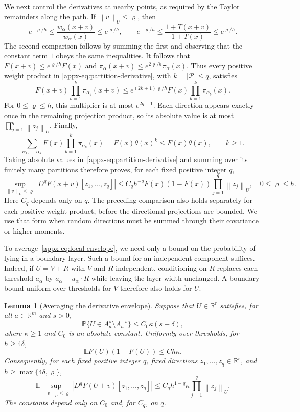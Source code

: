 \documentclass[11pt,letterpaper]{article}
\newtheorem{lemma}{Lemma}
\theoremstyle{remark}
\newcommand{\E}{\mathbb E}
\newcommand{\Pp}{\mathbb P}
\newcommand{\R}{\mathbb R}
\newcommand{\norm}[1]{\left\lVert#1\right\rVert}
\begin{document}
We next control the derivatives at nearby points, as required by
the Taylor remainders along the path. If $\norm v_U\le\varrho$, then
\[
 e^{-\varrho/h}\le
 \frac{w_\alpha(x+v)}{w_\alpha(x)}
 \le e^{\varrho/h},
 \qquad
 e^{-\varrho/h}\le
 \frac{1+T(x+v)}{1+T(x)}
 \le e^{\varrho/h}.
\]
The second comparison follows by summing the first and observing
that the constant term $1$ obeys the same inequalities.
It follows that $F(x+v)\le e^{\varrho/h}F(x)$ and
$\pi_\alpha(x+v)\le e^{2\varrho/h}\pi_\alpha(x)$.
Thus every positive weight product in
\eqref{appx-eq:partition-derivative}, with $k=|\mathcal P|\le q$,
satisfies
\[
 F(x+v)\prod_{b=1}^k\pi_{\alpha_b}(x+v)
 \le e^{(2k+1)\varrho/h}
        F(x)\prod_{b=1}^k\pi_{\alpha_b}(x).
\]
For $0\le\varrho\le h$, this multiplier is at most $e^{2q+1}$.
Each direction appears exactly once in the remaining projection
product, so its absolute value is at most
$\prod_{j=1}^q\norm{z_j}_U$. Finally,
\[
 \sum_{\alpha_1,\ldots,\alpha_k}
     F(x)\prod_{b=1}^k\pi_{\alpha_b}(x)
 =F(x)\theta(x)^k\le F(x)\theta(x),
 \qquad k\ge1.
\]
Taking absolute values in~\eqref{appx-eq:partition-derivative}
and summing over its finitely many partitions therefore proves,
for each fixed positive integer $q$,
\begin{equation}
 \sup_{\norm v_U\le\varrho}|D^qF(x+v)[z_1,\ldots,z_q]|
 \le C_qh^{-q}F(x)(1-F(x))\prod_{j=1}^q\norm{z_j}_U,
 \quad 0\le\varrho\le h.
 \label{appx-eq:local-envelope}
\end{equation}
Here $C_q$ depends only on $q$. The preceding comparison also holds
separately for each positive weight product, before the directional
projections are bounded. We use that form when random directions
must be summed through their covariance or higher moments.

To average~\eqref{appx-eq:local-envelope}, we need only a bound on
the probability of lying in a boundary layer. Such a bound for an
independent component suffices. Indeed, if $U=V+R$ with $V$ and $R$
independent, conditioning on $R$ replaces each threshold $a_\alpha$
by $a_\alpha-u_\alpha\cdot R$ while leaving the layer width unchanged.
A boundary bound uniform over thresholds for $V$ therefore also
holds for $U$.

\begin{lemma}[Averaging the derivative envelope]\label{appx-lem:envelope}
Suppose that $U\in\R^r$ satisfies, for all $a\in\R^m$ and $s>0$,
\[
 \Pp\{U\in A_a^s\setminus A_a^{-s}\}
 \le C_0\kappa(s+\delta),
\]
where $\kappa\ge1$ and $C_0$ is an absolute constant.
Uniformly over thresholds, for $h\ge4\delta$,
\begin{equation}
 \E F(U)(1-F(U))\le Ch\kappa.
 \label{appx-eq:small-envelope}
\end{equation}
Consequently, for each fixed positive integer $q$, fixed directions
$z_1,\ldots,z_q\in\R^r$, and $h\ge\max\{4\delta,\varrho\}$,
\begin{equation}
 \E\sup_{\norm v_U\le\varrho}|D^qF(U+v)[z_1,\ldots,z_q]|
 \le C_qh^{1-q}\kappa\prod_{j=1}^q\norm{z_j}_U.
 \label{appx-eq:averaged-derivatives}
\end{equation}
The constants depend only on $C_0$ and, for $C_q$, on $q$.
\end{lemma}
\end{document}
